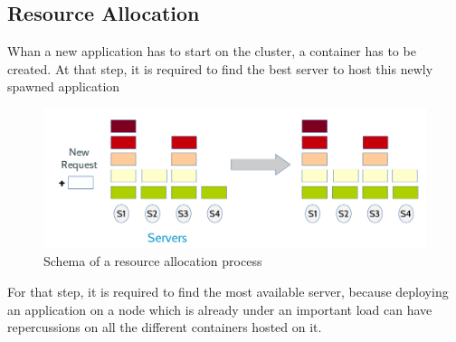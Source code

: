 \subsection{Resource Allocation}

Whan a new application has to start on the cluster, a container has to be
created.  At that step, it is required to find the best server to host this
newly spawned application

\begin{figure}[h!]
	\includegraphics[width=\textwidth]{./Images/resourceallocation.png}
	\caption{Schema of a resource allocation process}
\end{figure}

For that step, it is required to find the most available server, because
deploying an application on a node which is already under an important load can
have repercussions on all the different containers hosted on it.
